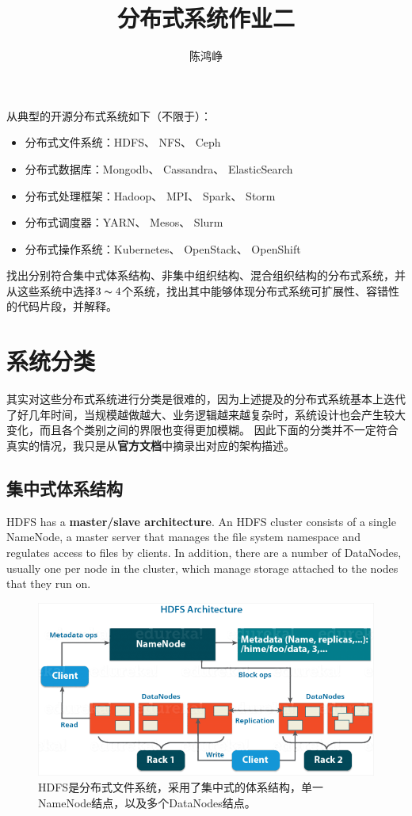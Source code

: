 \documentclass[logo,reportComp]{thesis}
\title{分布式系统作业二}
\subtitle{}
\author{陈鸿峥}
\begin{document}
\maketitle

\begin{question}
从典型的开源分布式系统如下（不限于）：
\begin{itemize}
\item 分布式文件系统：HDFS、 NFS、 Ceph
\item 分布式数据库：Mongodb、 Cassandra、 ElasticSearch
\item 分布式处理框架：Hadoop、 MPI、 Spark、 Storm
\item 分布式调度器：YARN、 Mesos、 Slurm
\item 分布式操作系统：Kubernetes、 OpenStack、 OpenShift
\end{itemize}
找出分别符合集中式体系结构、非集中组织结构、混合组织结构的分布式系统，并从这些系统中选择$3\thicksim 4$个系统，找出其中能够体现分布式系统可扩展性、容错性的代码片段，并解释。
\end{question}

\section{系统分类}
其实对这些分布式系统进行分类是很难的，因为上述提及的分布式系统基本上迭代了好几年时间，当规模越做越大、业务逻辑越来越复杂时，系统设计也会产生较大变化，而且各个类别之间的界限也变得更加模糊。
因此下面的分类并不一定符合真实的情况，我只是从\textbf{官方文档}中摘录出对应的架构描述。

\subsection{集中式体系结构}
\begin{flushleft}
HDFS has a \textbf{master/slave architecture}. An HDFS cluster consists of a single NameNode, a master server that manages the file system namespace and regulates access to files by clients. In addition, there are a number of DataNodes, usually one per node in the cluster, which manage storage attached to the nodes that they run on. 
\end{flushleft}
\begin{figure}[H]
\centering
\includegraphics[width=0.8\linewidth]{fig/hdfs.png}
\caption{HDFS\cite{bib:hdfs}是分布式文件系统，采用了集中式的体系结构，单一NameNode结点，以及多个DataNodes结点。}
\end{figure}
\end{document}
